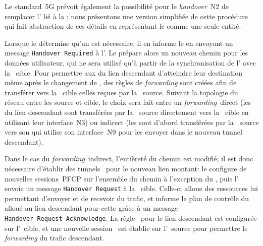 \documentclass[../main.tex]{subfiles}
\begin{document}
Le standard~5G prévoit également la possibilité pour le \textit{handover}~N2 de remplacer l’ lié à la ; nous présentons une version simplifiée de cette procédure qui fait abstraction de ces détails en représentant le  comme une seule entité.

Lorsque le  détermine qu’un  est nécessaire, il en informe le  en envoyant un message \texttt{Handover~Required} à l’.
Le  prépare alors un nouveau chemin pour les données utilisateur, qui ne sera utilisé qu’à partir de la synchronisation de l’ avec la ~cible.
Pour permettre aux  du lien descendant d’atteindre leur destination même après le changement de , des règles de \textit{forwarding} sont créées afin de transférer vers la ~cible celles reçues par la ~source.
Suivant la topologie du réseau entre les  source et cible, le choix sera fait entre un \textit{forwarding}~direct (les  du lien descendant sont transférées par la ~source directement vers la ~cible en utilisant leur interface~N3) ou indirect (les  sont d’abord transférées par la ~source vers son  qui utilise son interface~N9 pour les envoyer dans le nouveau tunnel~ descendant).

Dans le cas du \textit{forwarding}~indirect, l’entièreté du chemin est modifié; il est donc nécessaire d’établir des tunnels~ pour le nouveau lien montant: le  configure de nouvelles sessions~PFCP sur l’ensemble du chemin à l’exception du , puis l’ envoie un message \texttt{Handover Request} à la ~cible.
Celle-ci alloue des ressources lui permettant d’envoyer et de recevoir du trafic, et informe le plan de contrôle du  alloué au lien descendant pour cette  grâce à un message \texttt{Handover~Request~Acknowledge}.
La règle~ pour le lien descendant est configurée sur l’~cible, et une nouvelle session~ est établie sur l’~source pour permettre le \textit{forwarding} du trafic descendant.
\end{document}

